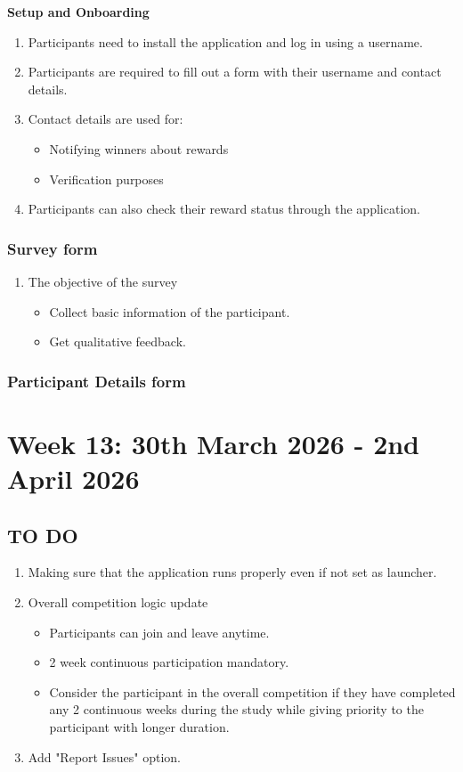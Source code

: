 \documentclass{article}
\begin{document}
\textbf{Setup and Onboarding}
\begin{enumerate}
    \item Participants need to install the application and log in using a username.
    \item Participants are required to fill out a form with their username and contact details.
    \item Contact details are used for:
    \begin{itemize}
        \item Notifying winners about rewards
        \item Verification purposes
    \end{itemize}
    \item Participants can also check their reward status through the application.
\end{enumerate}


\subsubsection{Survey form}
\begin{enumerate}
    \item The objective of the survey
    \begin{itemize}
        \item Collect basic information of the participant.
        \item Get qualitative feedback.
    \end{itemize}
\end{enumerate}


\subsubsection{Participant Details form}

\newpage
\section{Week 13: 30th March 2026 - 2nd April 2026}

\subsection{TO DO}
\begin{enumerate}
    \item Making sure that the application runs properly even if not set as launcher.
    \item Overall competition logic update
    \begin{itemize}
        \item Participants can join and leave anytime.
        \item 2 week continuous participation mandatory.
        \item Consider the participant in the overall competition if they have completed any 2 continuous weeks during the study while giving priority to the participant with longer duration.
    \end{itemize}
    \item Add "Report Issues" option.
\end{enumerate}
\end{document}
